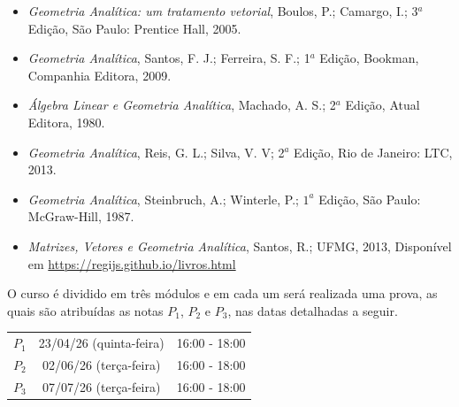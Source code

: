 \documentclass[12pt]{exam}
\begin{document}
    \begin{itemize}

    \item {\it Geometria Analítica: um tratamento vetorial}, Boulos, P.; Camargo, I.; 3$^a$ Edição, São Paulo: Prentice Hall, 2005.

    \item {\it Geometria Analítica},  Santos, F. J.; Ferreira, S. F.; 1$^{a}$ Edição, Bookman, Companhia Editora, 2009.

    \item {\it Álgebra Linear e Geometria Analítica}, Machado, A. S.; 2$^a$ Edição, Atual Editora, 1980.

    \item {\it Geometria Analítica}, Reis, G. L.; Silva, V. V; 2$^a$ Edição, Rio de Janeiro: LTC, 2013.

    \item {\it Geometria Analítica}, Steinbruch, A.; Winterle, P.; $1^a$ Edição, São Paulo: McGraw-Hill, 1987.

    \item {\it Matrizes, Vetores e Geometria Analítica}, Santos, R.;  UFMG, 2013, Disponível em \url{https://regijs.github.io/livros.html}

    \end{itemize}

     O curso é dividido em três módulos e em cada um será realizada uma prova, as quais são atribuídas as notas $P_1$, $P_2$ e $P_3$, nas datas detalhadas a seguir.

    \begin{center}
        \begin{tabular}{c|c|c}
            \hline\hline
            \hspace{1cm}{\bf Prova}\hspace{1cm} & \hspace{3cm}{\bf Data}\hspace{3cm} & \hspace{1.7cm}{\bf Horário}\hspace{1.7cm} \\
            \hline\hline
            $P_1$ & 23/04/26 (quinta-feira) \phantom{x} & 16:00 - 18:00 \\
            \hline
            $P_2$ & 02/06/26 (terça-feira) \phantom{x} & 16:00 - 18:00 \\
            \hline
            $P_3$ & 07/07/26 (terça-feira) \phantom{x} & 16:00 - 18:00 \\
            \hline\hline
        \end{tabular}
    \end{center}
\end{document}
